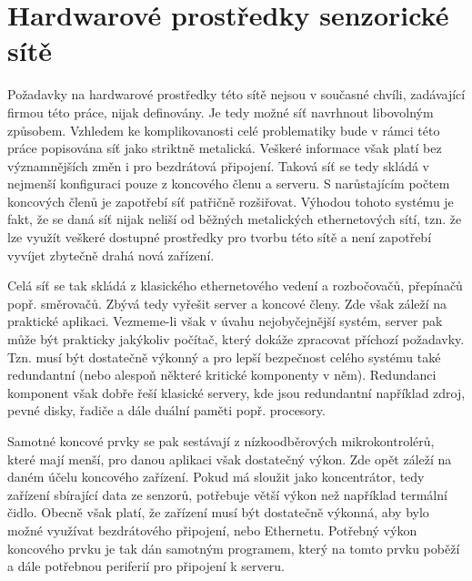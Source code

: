 \section{Hardwarové prostředky senzorické sítě}
Požadavky na hardwarové prostředky této sítě nejsou v současné chvíli, zadávající firmou této práce, nijak definovány. Je tedy možné síť navrhnout libovolným způsobem. Vzhledem ke komplikovanosti celé problematiky bude v rámci této práce popisována síť jako striktně metalická. Veškeré informace však platí bez významnějších změn i pro bezdrátová připojení. Taková síť se tedy skládá v nejmenší konfiguraci pouze z koncového členu a serveru. S narůstajícím počtem koncových členů je zapotřebí síť patřičně rozšiřovat. Výhodou tohoto systému je fakt, že se daná síť nijak neliší od běžných metalických ethernetových sítí, tzn. že lze využít veškeré dostupné prostředky pro tvorbu této sítě a není zapotřebí vyvíjet zbytečně drahá nová zařízení.

Celá síť se tak skládá z klasického ethernetového vedení a rozbočovačů, přepínačů popř. směrovačů. Zbývá tedy vyřešit server a koncové členy. Zde však záleží na praktické aplikaci. Vezmeme-li však v úvahu nejobyčejnější systém, server pak může být prakticky jakýkoliv počítač, který dokáže zpracovat příchozí požadavky. Tzn. musí být dostatečně výkonný a pro lepší bezpečnost celého systému také redundantní (nebo alespoň některé kritické komponenty v něm). Redundanci komponent však dobře řeší klasické servery, kde jsou redundantní například zdroj, pevné disky, řadiče a dále duální paměti popř. procesory.

Samotné koncové prvky se pak sestávají z nízkoodběrových mikrokontrolérů,  které mají menší, pro danou aplikaci však dostatečný výkon. Zde opět záleží na daném účelu koncového zařízení. Pokud má sloužit jako koncentrátor, tedy zařízení sbírající data ze senzorů, potřebuje větší výkon než například termální čidlo. Obecně však platí, že zařízení musí být dostatečně výkonná, aby bylo možné využívat bezdrátového připojení, nebo Ethernetu.  Potřebný výkon koncového prvku je tak dán samotným programem, který na tomto prvku poběží a dále potřebnou periferií pro připojení k serveru.

